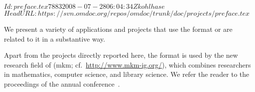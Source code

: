 \svnInfo $Id: preface.tex 7883 2008-07-28 06:04:34Z kohlhase $
\svnKeyword $HeadURL: https://svn.omdoc.org/repos/omdoc/trunk/doc/projects/preface.tex $

We present a variety of applications and projects that use the {\omdoc} format or are
related to it in a substantive way.

Apart from the projects directly reported here, the {\omdoc} format is used by the new
research field of {} ({\sc mkm};
cf.~\url{http://www.mkm-ig.org/}), which combines researchers in mathematics, computer
science, and library science. We refer the reader to the proceedings of the annual
{} conference~\cite{MKM01,MKM03,MKM04,MKM05,MKM06}.



